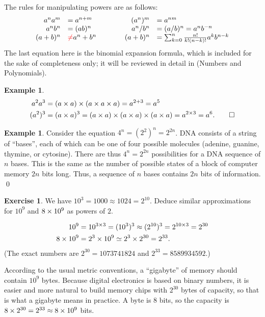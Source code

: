\documentclass[a4paper]{book}
\theoremstyle{definition}
\newtheorem{example}[theorem]{Example}
\newtheorem{exercise}[theorem]{Exercise}
\renewenvironment{solution}{\SolutionInline}{\endSolutionInline}
\begin{document}
The rules for manipulating powers are as follows:
\[\begin{array}{rlcrl}
 {a^na^m}  & {=a^{n+m}} 
  & \hspace{2em} & 
 {(a^n)^m} & {=a^{nm}} \\ 
 {a^nb^n}  & {=(ab)^n} &&
 {a^n/b^n} & {=(a/b)^n=a^nb^{-n}} \\
 {(a+b)^n} & {{\color{red}\neq} a^n+b^n} &&
 {(a+b)^n} &
  {=\sum_{k=0}^n \frac{n!}{k!(n-k)!} a^k b^{n-k}} \\
\end{array}\]
The last equation here is the binomial expansion formula, which is
included for the sake of completeness only; it will be reviewed in
detail in  (Numbers and Polynomials).

\begin{example}
 \begin{align*}
  a^2a^3  &= (a\times a)\times(a\times a\times a) = a^{2+3} = a^5 \\
  (a^2)^3 &= (a\times a)^3 = (a\times a)\times(a\times a)\times(a\times a)
           = a^{2\times 3} = a^6. \qed
 \end{align*}
\end{example}
\begin{example}
 Consider the equation $4^n=(2^2)^n=2^{2n}$.  DNA consists of a string
 of ``bases'', each of which can be one of four possible molecules
 (adenine, guanine, thymine, or cytosine).  There are thus
 $4^n=2^{2n}$ possibilities for a DNA sequence of $n$ bases.  This is
 the same as the number of possible states of a block of computer
 memory $2n$ bits long.  Thus, a sequence of $n$ bases contains $2n$
 bits of information. \qed
\end{example}
\begin{exercise}
 We have $10^3=1000\approx 1024=2^{10}$.  Deduce similar
 approximations for $10^9$ and $8\times 10^9$ as powers of $2$.
\end{exercise}
\begin{solution}
 \begin{align*}
  10^9 &=10^{3\times 3}=(10^3)^3\approx(2^{10})^3=2^{10\times 3}=2^{30}\\
  8\times 10^9 &= 2^3\times 10^9\simeq 2^3\times 2^{30} = 2^{33}.
 \end{align*}
 (The exact numbers are $2^{30}=1073741824$ and $2^{33}=8589934592$.)

 According to the usual metric conventions, a ``gigabyte'' of memory
 should contain $10^9$ bytes.  Because digital electronics is based on
 binary numbers, it is easier and more natural to build memory chips
 with $2^{30}$ bytes of capacity, so that is what a gigabyte means in
 practice.  A byte is $8$ bits, so the capacity is
 $8\times 2^{30}=2^{33}\approx 8\times 10^9$ bits.
\end{solution}
\end{document}
